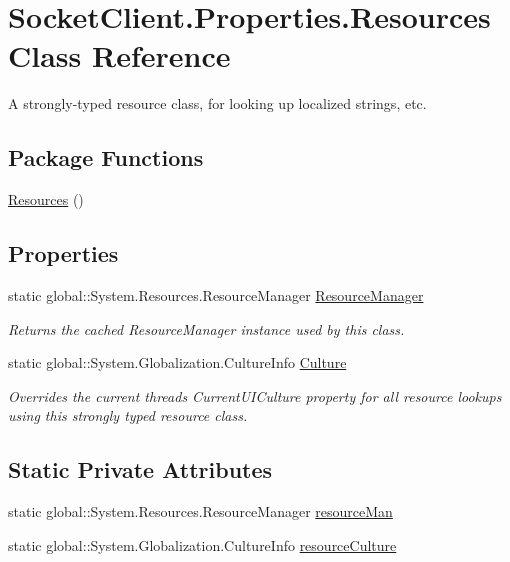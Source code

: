 \hypertarget{class_socket_client_1_1_properties_1_1_resources}{}\section{Socket\+Client.\+Properties.\+Resources Class Reference}
\label{class_socket_client_1_1_properties_1_1_resources}


A strongly-\/typed resource class, for looking up localized strings, etc.  


\subsection*{Package Functions}
\begin{DoxyCompactItemize}
\item 
\hyperlink{class_socket_client_1_1_properties_1_1_resources_a67d76a00178dd0e61fd8268aa0f309cd}{Resources} ()
\end{DoxyCompactItemize}
\subsection*{Properties}
\begin{DoxyCompactItemize}
\item 
static global\+::\+System.\+Resources.\+Resource\+Manager \hyperlink{class_socket_client_1_1_properties_1_1_resources_a217eee2c70eb7818406e429aaf1fa0ce}{Resource\+Manager}
\begin{DoxyCompactList}\small\item\em Returns the cached Resource\+Manager instance used by this class. \end{DoxyCompactList}\item 
static global\+::\+System.\+Globalization.\+Culture\+Info \hyperlink{class_socket_client_1_1_properties_1_1_resources_a0688ff6f826bff289a7b7f430d79f430}{Culture}
\begin{DoxyCompactList}\small\item\em Overrides the current thread\textquotesingle{}s Current\+U\+I\+Culture property for all resource lookups using this strongly typed resource class. \end{DoxyCompactList}\end{DoxyCompactItemize}
\subsection*{Static Private Attributes}
\begin{DoxyCompactItemize}
\item 
static global\+::\+System.\+Resources.\+Resource\+Manager \hyperlink{class_socket_client_1_1_properties_1_1_resources_ac6619cbc123542b717ab8e1f6c6b1933}{resource\+Man}
\item 
static global\+::\+System.\+Globalization.\+Culture\+Info \hyperlink{class_socket_client_1_1_properties_1_1_resources_a97c740384901159c635e37ecc54d5a9a}{resource\+Culture}
\end{DoxyCompactItemize}


